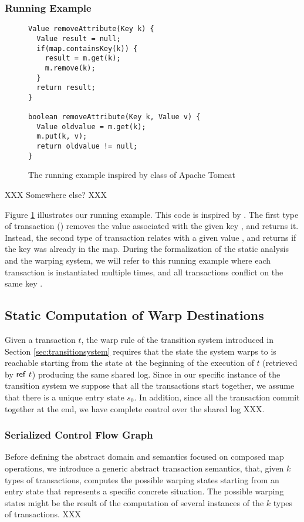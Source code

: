 \subsubsection{Running Example}

\begin{figure}
\begin{lstlisting}
Value removeAttribute(Key k) {
  Value result = null;
  if(map.containsKey(k)) {
    result = m.get(k);
    m.remove(k);
  }
  return result;
}
	
boolean removeAttribute(Key k, Value v) {
  Value oldvalue = m.get(k);
  m.put(k, v);
  return oldvalue != null;
}
\end{lstlisting}
\caption{The running example inspired by class  of Apache Tomcat}
\label{lst:runningexamplestaticanalysis}
\end{figure}

XXX Somewhere else? XXX

Figure \ref{lst:runningexamplestaticanalysis} illustrates our running example. This code is inspired by . The first type of transaction () removes the value associated with the given key , and returns it. Instead, the second type of transaction relates  with a given value , and returns  if the key was already in the map. During the formalization of the static analysis and the warping system, we will refer to this running example where each transaction is instantiated multiple times, and all transactions conflict on the same key .


\subsection{Static Computation of Warp Destinations}
Given a transaction $t$, the {\sf warp} rule of the transition system introduced in Section \ref{sec:transitionsystem} requires that the state the system warps to is reachable starting from the state at the beginning of the execution of $t$ (retrieved by ${\sf ref}\ t$) producing the same shared log. Since in our specific instance of the transition system we suppose that all the transactions start together, we assume that there is a unique entry state $s_0$. In addition, since all the transaction commit together at the end, we have complete control over the shared log XXX.

\subsubsection{Serialized Control Flow Graph}
\label{Se:concabs}
Before defining the abstract domain and semantics focused on composed map operations, we introduce a generic abstract transaction semantics, that, given $k$ types of transactions, computes the possible warping states starting from an entry state that represents a specific concrete situation. The possible warping states might be the result of the computation of several instances of the $k$ types of transactions. XXX

